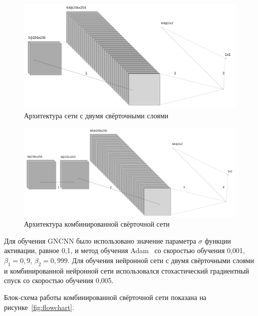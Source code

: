 \begin{figure}[!htb]
\centering
\includegraphics[width=1\textwidth]{include/graphics/french_color_architecture}
\caption{Архитектура сети с двумя свёрточными слоями}
\label{fig:ColorFrenchCNNArchitecture}
\end{figure}

\begin{figure}[!htb]
\centering
\includegraphics[width=1\textwidth]{include/graphics/mixed_color_architecture}
\caption{Архитектура комбинированной свёрточной сети}
\label{fig:ColorMixedCNNArchitecture}
\end{figure}

Для обучения GNCNN было использовано значение параметра $ \sigma $ функции активации, равное 0,1, и метод обучения Adam~\cite{Adam} со скоростью обучения 0,001, $ \beta_1 = 0,9 $, $ \beta_2 = 0,999 $. Для обучения нейронной сети с двумя свёрточными слоями и комбинированной нейронной сети использовался стохастический градиентный спуск со скоростью обучения 0,005.

Блок-схема работы комбинированной свёрточной сети показана на рисунке~\ref{fig:flowchart}.


